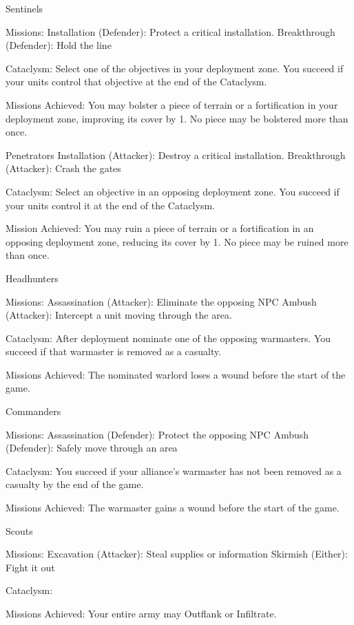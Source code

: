 \documentclass{40k}
\begin{document}
\restorebackground

Sentinels

Missions:
  Installation (Defender): Protect a critical installation.
  Breakthrough (Defender): Hold the line

Cataclysm:
  Select one of the objectives in your deployment zone.
  You succeed if your units control that objective at the end of the Cataclysm.

Missions Achieved:
  You may bolster a piece of terrain or a fortification in your
  deployment zone, improving its cover by 1.
  No piece may be bolstered more than once.


Penetrators
  Installation (Attacker): Destroy a critical installation.
  Breakthrough (Attacker): Crash the gates

Cataclysm:
  Select an objective in an opposing deployment zone.
  You succeed if your units control it at the end of the Cataclysm.

Mission Achieved:
  You may ruin a piece of terrain or a fortification in an opposing
  deployment zone, reducing its cover by 1.
  No piece may be ruined more than once.



Headhunters

Missions:
  Assassination (Attacker): Eliminate the opposing NPC
  Ambush (Attacker): Intercept a unit moving through the area.

Cataclysm:
  After deployment nominate one of the opposing warmasters.
  You succeed if that warmaster is removed as a casualty.

Missions Achieved:
  The nominated warlord loses a wound before the start of the game.



Commanders

Missions:
  Assassination (Defender): Protect the opposing NPC
  Ambush (Defender): Safely move through an area

Cataclysm:
  You succeed if your alliance's warmaster has not been removed as a casualty by the end of the game.

Missions Achieved:
  The warmaster gains a wound before the start of the game.



Scouts

Missions:
  Excavation (Attacker): Steal supplies or information
  Skirmish (Either): Fight it out

Cataclysm:

Missions Achieved:
  Your entire army may Outflank or Infiltrate.
\end{document}
